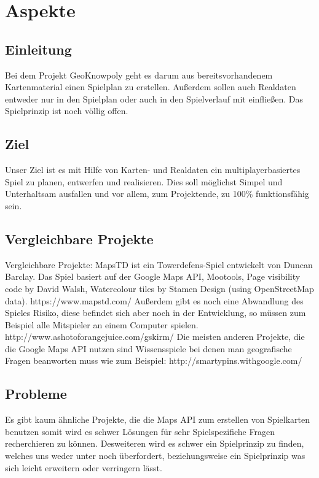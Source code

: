 \documentclass[11pt,a4paper]{article}
\begin{document}
\section{Aspekte}
\subsection{Einleitung}
Bei dem Projekt GeoKnowpoly geht es darum aus bereitsvorhandenem Kartenmaterial einen Spielplan zu erstellen. Außerdem sollen auch Realdaten entweder nur in den Spielplan oder auch in den Spielverlauf mit einfließen. Das Spielprinzip ist noch völlig offen.
\subsection{Ziel}
Unser Ziel ist es mit Hilfe von Karten- und Realdaten ein multiplayerbasiertes Spiel zu planen, entwerfen und realisieren.
Dies soll möglichst Simpel und Unterhaltsam ausfallen und vor allem, zum Projektende, zu 100\% funktionsfähig sein. 
\subsection{Vergleichbare Projekte}
Vergleichbare Projekte:
MapsTD ist ein Towerdefens-Spiel entwickelt von Duncan Barclay. Das Spiel basiert auf der Google Maps API, Mootools, Page visibility code by David Walsh, Watercolour tiles by Stamen Design (using OpenStreetMap data).
https://www.mapstd.com/
Außerdem gibt es noch eine Abwandlung des Spieles Risiko, diese befindet sich aber noch in der Entwicklung, so müssen zum Beispiel alle Mitspieler an einem Computer spielen.
http://www.ashotoforangejuice.com/gskirm/
Die meisten anderen Projekte, die die Google Maps API nutzen sind Wissensspiele bei denen man geografische Fragen beanworten muss wie zum Beispiel:
http://smartypins.withgoogle.com/
\subsection{Probleme}
Es gibt kaum ähnliche Projekte, die die Maps API zum erstellen von Spielkarten benutzen somit wird es schwer Lösungen für sehr Spielspezifiche Fragen recherchieren zu können. Desweiteren wird es schwer ein Spielprinzip zu finden, welches uns weder unter noch überfordert, beziehungsweise ein Spielprinzip was sich leicht erweitern oder verringern lässt.
\end{document}
